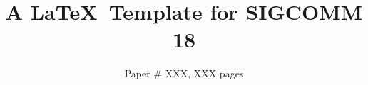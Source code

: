 \documentclass[sigconf]{acmart}
\begin{document}
\title{A \LaTeX\ Template for SIGCOMM 18}


\author{Paper \# XXX, XXX pages}

\renewcommand{\shortauthors}{X.et al.}

\begin{abstract}
    \blindtext
\end{abstract}

\maketitle





\end{document}

